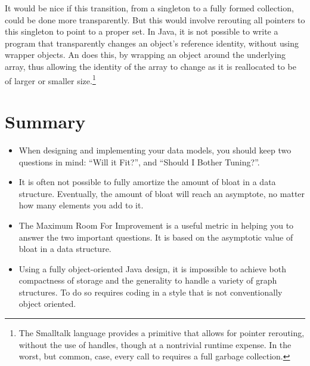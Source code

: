 It would be nice if this transition, from a singleton to a fully formed
collection, could be done more transparently. But this would involve rerouting
all pointers to this singleton to point to a proper set. In Java, it is not
possible to write a program that transparently changes an object's reference
identity, without using wrapper objects.
An  does this, by wrapping an object around the underlying
array, thus allowing the identity of the array to change as it is reallocated
to be of larger or smaller size.\footnote{The Smalltalk
language provides a  primitive that allows for pointer
rerouting, without the use of handles, though at a nontrivial runtime expense.
In the worst, but common, case, every call to  requires a full
garbage collection.}

\section{Summary}

\begin{itemize}
  \item When designing and implementing your data models, you should keep two
  questions in mind: ``Will it Fit?'', and ``Should I Bother Tuning?''.
  \item It is often not possible to fully amortize the amount of bloat in a data
  structure. Eventually, the amount of bloat will reach an asymptote, no matter
  how many elements you add to it.
  \item The Maximum Room For Improvement is a useful metric in helping you to
  answer the two important questions. It is based on the asymptotic value of
  bloat in a data structure.
  \item Using a fully object-oriented Java design, it is impossible to achieve
  both compactness of storage and the generality to handle a variety of graph
structures. To do so requires coding in a style that is not conventionally
object oriented.
\end{itemize}


